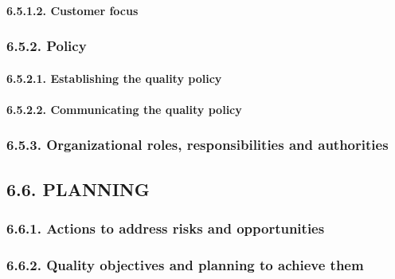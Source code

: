 \documentclass[
]{article}
\begin{document}
\hypertarget{customer-focus-1}{%
\paragraph{6.5.1.2. Customer focus}\label{customer-focus-1}}

\hypertarget{policy-1}{%
\subsubsection{6.5.2. Policy}\label{policy-1}}

\hypertarget{establishing-the-quality-policy-1}{%
\paragraph{6.5.2.1. Establishing the quality
policy}\label{establishing-the-quality-policy-1}}

\hypertarget{communicating-the-quality-policy-1}{%
\paragraph{6.5.2.2. Communicating the quality
policy}\label{communicating-the-quality-policy-1}}

\hypertarget{organizational-roles-responsibilities-and-authorities-1}{%
\subsubsection{6.5.3. Organizational roles, responsibilities and
authorities}\label{organizational-roles-responsibilities-and-authorities-1}}

\hypertarget{planning-1}{%
\subsection{6.6. PLANNING}\label{planning-1}}

\hypertarget{actions-to-address-risks-and-opportunities-1}{%
\subsubsection{6.6.1. Actions to address risks and
opportunities}\label{actions-to-address-risks-and-opportunities-1}}

\hypertarget{quality-objectives-and-planning-to-achieve-them-1}{%
\subsubsection{6.6.2. Quality objectives and planning to achieve
them}\label{quality-objectives-and-planning-to-achieve-them-1}}
\end{document}
